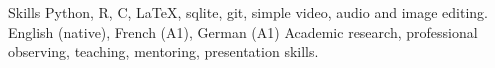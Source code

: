 
\begin{rubric}{Skills}
	Python, R, C, \LaTeX, {\sc sqlite}, git, simple video, audio and image editing.
    English (native), French (A1), German (A1)
\entry*[Misc.]
	Academic research, professional observing, teaching, mentoring, presentation skills.
\end{rubric}

